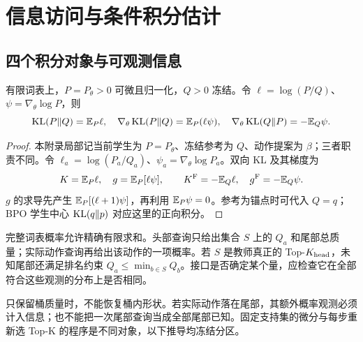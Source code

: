 \chapter{信息访问与条件积分估计}
\label{app:estimation}
\section{四个积分对象与可观测信息}
\begin{proposition}[双向 KL 的数值与梯度积分]
有限词表上，$P=P_\theta>0$ 可微且归一化，$Q>0$ 冻结。令 $\ell=\log(P/Q)$、$\psi=\nabla_\theta\log P$，则
\begin{equation}
\operatorname{KL}(P\Vert Q)=\mathbb E_P\ell,\quad \nabla_\theta\operatorname{KL}(P\Vert Q)=\mathbb E_P(\ell\psi),\quad
\nabla_\theta\operatorname{KL}(Q\Vert P)=-\mathbb E_Q\psi.
\end{equation}
\end{proposition}
\begin{proof}
本附录局部记当前学生为 $P=P_\theta$、冻结参考为 $Q$、动作提案为 $\beta$；三者职责不同。令 $\ell_a=\log(P_a/Q_a)$、$\psi_a=\nabla_\theta\log P_a$。双向 KL 及其梯度为
\begin{equation}
K=\mathbb E_P\ell,\quad g=\mathbb E_P[\ell\psi],\qquad
K^{\rm F}=-\mathbb E_Q\ell,\quad g^{\rm F}=-\mathbb E_Q\psi.
\label{eq:four-integrals}
\end{equation}
$g$ 的求导先产生 $\mathbb E_P[(\ell+1)\psi]$，再利用 $\mathbb E_P\psi=0$。参考为锚点时可代入 $Q=q$；BPO 学生中心 $\operatorname{KL}(q\Vert p)$ 对应这里的正向积分。
\end{proof}

完整词表概率允许精确有限求和。头部查询只给出集合 $S$ 上的 $Q_a$ 和尾部总质量；实际动作查询再给出该动作的一项概率。若 $S$ 是教师真正的 Top-$K_{\rm head}$，未知尾部还满足排名约束 $Q_a\le\min_{b\in S}Q_b$。接口是否确定某个量，应检查它在全部符合这些观测的分布上是否相同。

只保留桶质量时，不能恢复桶内形状。若实际动作落在尾部，其额外概率观测必须计入信息；也不能把一次尾部查询当成全部尾部已知。固定支持集的微分与每步重新选 Top-K 的程序是不同对象，以下推导均冻结分区。

